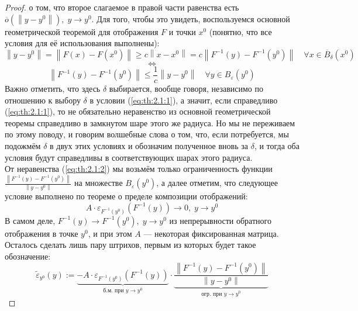 \documentclass[11pt]{article}
\begin{document}
\begin{proof}
    о том, что второе слагаемое в правой части равенства есть $\overline{o} \left(\left\lVert y - y^0 \right\rVert \right), \; y \to y^0$. Для того, чтобы это увидеть, воспользуемся основной геометрической теоремой для отображения $F$ и точки $x^0$ (понятно, что все условия для её использования выполнены):
    \[\left\lVert y - y^0 \right\rVert = \left\lVert F\left(x\right) - F\left(x^0\right) \right\rVert \geq c \left\lVert x - x^0 \right\rVert = c \left\lVert F^{-1}\left(y\right) - F^{-1}\left(y^0\right)\right\rVert \quad \forall x \in \overline{B}_{\delta}\left(x^0\right)\]
    \[\iff\]
    \begin{equation*} \label{eq:th:2.1:2} \tag{$\star \star$}
        \left\lVert F^{-1}\left(y\right) - F^{-1}\left(y^0\right)\right\rVert \leq \frac{1}{c} \left\lVert y - y^0 \right\rVert \quad \forall y \in B_{\varepsilon}\left(y^0\right)
    \end{equation*}
    Важно отметить, что здесь $\delta$ выбирается, вообще говоря, независимо по отношению к выбору $\delta$ в условии (\ref{eq:th:2.1:1}), а значит, если справедливо (\ref{eq:th:2.1:1}), то не обязательно 
    неравенство из основной геометрической теоремы справедливо в замкнутом шаре этого же радиуса. Но мы не переживаем по этому поводу, и говорим волшебные слова о том, что, если потребуется, 
    мы подожмём $\delta$ в двух этих условиях и обозначим полученное вновь за $\delta$, и тогда оба условия будут справедливы в соответствующих шарах этого радиуса. 
    \\
    От неравенства (\ref{eq:th:2.1:2}) мы возьмём только ограниченность функции
    $\frac{\left\lVert F^{-1}\left(y\right) - F^{-1}\left(y^0\right)\right\rVert}{\left\lVert y - y^0 \right\rVert}$
    на множестве $B_{\varepsilon}\left(y^0\right)$, а далее отметим, что следующее условие выполнено по теореме о пределе композиции отображений:
    \[A \cdot \varepsilon_{F^{-1}\left(y^0\right)} \left(F^{-1}(y)\right) \to 0, \; y \to y^0\]
    В самом деле, $F^{-1}(y) \to F^{-1}\left(y^0\right), \; y \to y^0$ из непрерывности обратного отображения в точке $y^0$, и при этом $A$ --- некоторая фиксированная матрица.
    \\
    Осталось сделать лишь пару штрихов, первым из которых будет такое обозначение:
    \[\widetilde{\varepsilon}_{y^0} (y) := \underbrace{-A \cdot \varepsilon_{F^{-1}\left(y^0\right)} \left(F^{-1}(y)\right)}_{\text{б.м. при } y \to y^0} \cdot \underbrace{\frac{\left\lVert F^{-1}\left(y\right) - F^{-1}\left(y^0\right)\right\rVert}{\left\lVert y - y^0 \right\rVert}}_{\text{огр. при } y \to y^0}\]

\end{proof}
\end{document}
